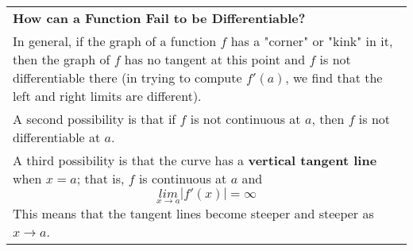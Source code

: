 \documentclass[fleqn]{article}
\begin{document}
\begin{center}
\def\arraystretch{1.3}
{\setlength{\tabcolsep}{16pt}
\begin{tabularx}{.9\textwidth}{|X|}
\hline
	\vspace{1pt}
	\textbf{How can a Function Fail to be Differentiable?} \\
	In general, if the graph of a function $f$ has a "corner" or "kink" in it, then the graph of $f$ has no tangent at this point and $f$ is not differentiable there (in trying to compute $f'(a)$, we find that the left and right limits are different). \\[3pt]
	A second possibility is that if $f$ is not continuous at $a$, then $f$ is not differentiable at $a$. \\[3pt]
	A third possibility is that the curve has a \textbf{vertical tangent line} when $x = a$; that is, $f$ is continuous at $a$ and 
	$$\underset{x \to a}{lim} |f'(x)| = \infty$$
	This means that the tangent lines become steeper and steeper as $x \to a$.
	\\[16pt]
	\hline
\end{tabularx}}
\vspace{12pt}


\end{center}
\end{document}
